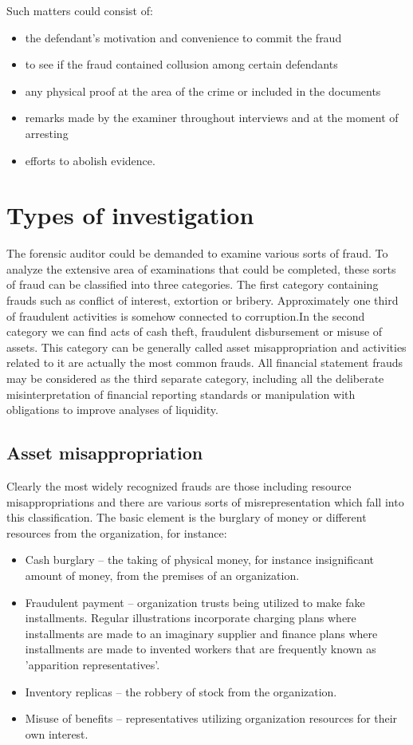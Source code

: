 Such matters could consist of: 
\begin{itemize}
\item the defendant's motivation and convenience to commit the fraud 
\item to see if the fraud contained collusion among certain defendants
\item any physical proof at the area of the crime or included in the documents 
\item remarks made by the examiner throughout interviews and at the moment of arresting 
\item efforts to abolish evidence.
\end{itemize}

\section{Types of investigation}

The forensic auditor could be demanded to examine various sorts of fraud. To analyze the extensive area of examinations that could be completed, these sorts of fraud can be classified into three categories. The first category containing frauds such as conflict of interest, extortion or bribery. Approximately one third of fraudulent activities is somehow connected to corruption.In the second category we can find acts of cash theft, fraudulent disbursement or misuse of assets. This category can be generally called asset misappropriation and activities related to it are actually the most common frauds. All financial statement frauds may be considered as the third separate category, including all the deliberate misinterpretation of financial reporting standards or manipulation with obligations to improve analyses of liquidity. 



\subsection{Asset misappropriation}
Clearly the most widely recognized frauds are those including resource misappropriations and there are various sorts of misrepresentation which fall into this classification. The basic element is the burglary of money or different resources from the organization, for instance: 

\begin{itemize}
\item Cash burglary – the taking of physical money, for instance insignificant amount of money, from the premises of an organization.
\item Fraudulent payment – organization trusts being utilized to make fake installments. Regular illustrations incorporate charging plans where installments are made to an imaginary supplier and finance plans where installments are made to invented workers that are frequently known as 'apparition representatives'.
\item Inventory replicas – the robbery of stock from the organization. 
\item Misuse of benefits – representatives utilizing organization resources for their own interest.
\end{itemize}


